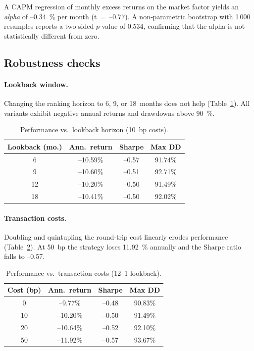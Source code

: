 \documentclass[11pt]{article}
\begin{document}
A CAPM regression of monthly excess returns on the market factor yields an \emph{alpha} of --0.34~\% per month (t~=~--0.77).  
A non‑parametric bootstrap with 1\,000 resamples reports a two‑sided $p$‑value of 0.534, confirming that the alpha is not statistically different from zero.

\subsection{Robustness checks}

\paragraph{Lookback window.}
Changing the ranking horizon to 6, 9, or 18 months does not help (Table~\ref{tab:lookback}).  
All variants exhibit negative annual returns and drawdowns above 90~\%.

\begin{table}[h!]
  \centering
  \begin{tabular}{cccc}
    \toprule
    Lookback (mo.) & Ann.\ return & Sharpe & Max DD \\ \midrule
    6  & --10.59\% & --0.57 & 91.74\% \\
    9  & --10.60\% & --0.51 & 92.71\% \\
    12 & --10.20\% & --0.50 & 91.49\% \\
    18 & --10.41\% & --0.50 & 92.02\% \\ \bottomrule
  \end{tabular}
  \caption{Performance vs.\ lookback horizon (10~bp costs).}
  \label{tab:lookback}
\end{table}

\paragraph{Transaction costs.}
Doubling and quintupling the round‑trip cost linearly erodes performance (Table~\ref{tab:tc}).  
At 50~bp the strategy loses 11.92~\% annually and the Sharpe ratio falls to --0.57.

\begin{table}[h!]
  \centering
  \begin{tabular}{cccc}
    \toprule
    Cost (bp) & Ann.\ return & Sharpe & Max DD \\ \midrule
    0  & --9.77\%  & --0.48 & 90.83\% \\
    10 & --10.20\% & --0.50 & 91.49\% \\
    20 & --10.64\% & --0.52 & 92.10\% \\
    50 & --11.92\% & --0.57 & 93.67\% \\ \bottomrule
  \end{tabular}
  \caption{Performance vs.\ transaction costs (12--1 lookback).}
  \label{tab:tc}
\end{table}
\end{document}
